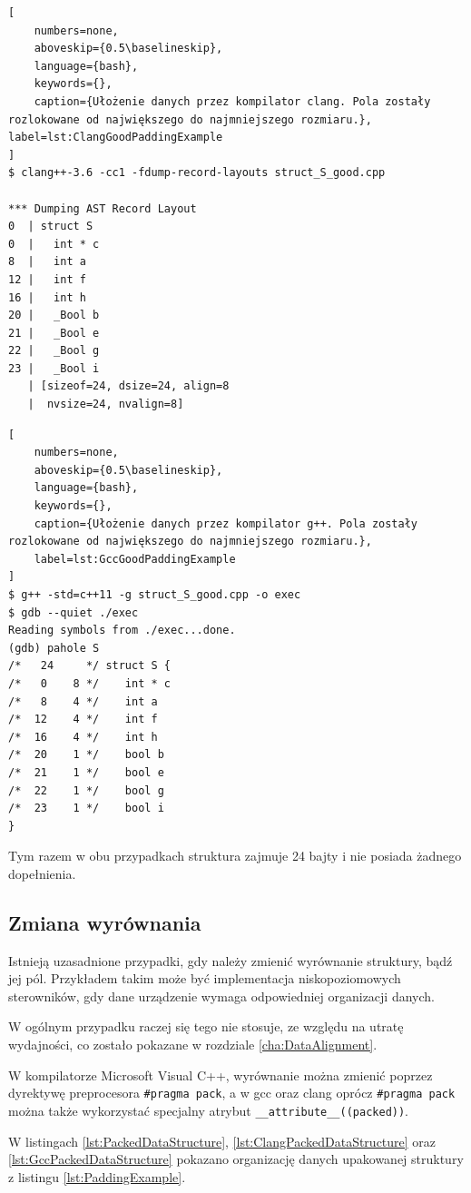\begin{lstlisting}[
    numbers=none,
    aboveskip={0.5\baselineskip},
    language={bash},
    keywords={},
    caption={Ułożenie danych przez kompilator clang. Pola zostały rozlokowane od największego do najmniejszego rozmiaru.}, label=lst:ClangGoodPaddingExample
]
$ clang++-3.6 -cc1 -fdump-record-layouts struct_S_good.cpp 

*** Dumping AST Record Layout
0  | struct S
0  |   int * c
8  |   int a
12 |   int f
16 |   int h
20 |   _Bool b
21 |   _Bool e
22 |   _Bool g
23 |   _Bool i
   | [sizeof=24, dsize=24, align=8
   |  nvsize=24, nvalign=8]
\end{lstlisting}


\begin{lstlisting}[
    numbers=none,
    aboveskip={0.5\baselineskip},
    language={bash},
    keywords={},
    caption={Ułożenie danych przez kompilator g++. Pola zostały rozlokowane od największego do najmniejszego rozmiaru.},
    label=lst:GccGoodPaddingExample
]
$ g++ -std=c++11 -g struct_S_good.cpp -o exec
$ gdb --quiet ./exec
Reading symbols from ./exec...done.
(gdb) pahole S
/*   24     */ struct S {
/*   0    8 */    int * c
/*   8    4 */    int a
/*  12    4 */    int f
/*  16    4 */    int h
/*  20    1 */    bool b
/*  21    1 */    bool e
/*  22    1 */    bool g
/*  23    1 */    bool i
}
\end{lstlisting}

Tym razem w obu przypadkach struktura zajmuje 24 bajty i nie posiada żadnego dopełnienia.

\subsection{Zmiana wyrównania}

Istnieją uzasadnione przypadki, gdy należy zmienić wyrównanie struktury, bądź jej pól. Przykładem takim może być implementacja niskopoziomowych sterowników, gdy dane urządzenie wymaga odpowiedniej organizacji danych.

W ogólnym przypadku raczej się tego nie stosuje, ze względu na utratę wydajności, co zostało pokazane w rozdziale \ref{cha:DataAlignment}.

W kompilatorze Microsoft Visual C++, wyrównanie można zmienić poprzez dyrektywę preprocesora \texttt{\#pragma pack}, a w gcc oraz clang oprócz \texttt{\#pragma pack} można także wykorzystać specjalny atrybut \texttt{\_\_attribute\_\_((packed))}.

W listingach \ref{lst:PackedDataStructure}, \ref{lst:ClangPackedDataStructure} oraz \ref{lst:GccPackedDataStructure} pokazano organizację danych upakowanej struktury z listingu \ref{lst:PaddingExample}.

